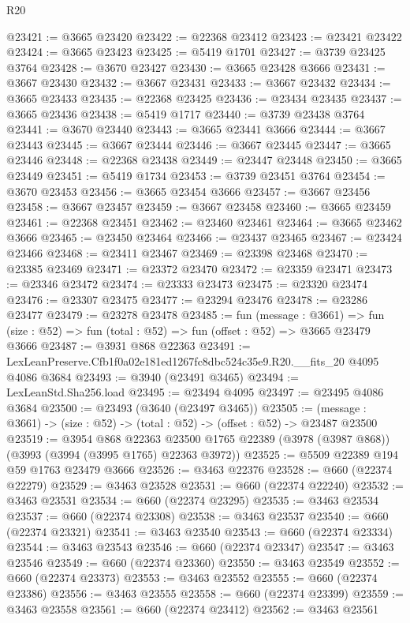 \begin{lexlean}{R20}
\begin{coremodule}
@23421 := @3665 @23420
@23422 := @22368 @23412
@23423 := @23421 @23422
@23424 := @3665 @23423
@23425 := @5419 @1701
@23427 := @3739 @23425 @3764
@23428 := @3670 @23427
@23430 := @3665 @23428 @3666
@23431 := @3667 @23430
@23432 := @3667 @23431
@23433 := @3667 @23432
@23434 := @3665 @23433
@23435 := @22368 @23425
@23436 := @23434 @23435
@23437 := @3665 @23436
@23438 := @5419 @1717
@23440 := @3739 @23438 @3764
@23441 := @3670 @23440
@23443 := @3665 @23441 @3666
@23444 := @3667 @23443
@23445 := @3667 @23444
@23446 := @3667 @23445
@23447 := @3665 @23446
@23448 := @22368 @23438
@23449 := @23447 @23448
@23450 := @3665 @23449
@23451 := @5419 @1734
@23453 := @3739 @23451 @3764
@23454 := @3670 @23453
@23456 := @3665 @23454 @3666
@23457 := @3667 @23456
@23458 := @3667 @23457
@23459 := @3667 @23458
@23460 := @3665 @23459
@23461 := @22368 @23451
@23462 := @23460 @23461
@23464 := @3665 @23462 @3666
@23465 := @23450 @23464
@23466 := @23437 @23465
@23467 := @23424 @23466
@23468 := @23411 @23467
@23469 := @23398 @23468
@23470 := @23385 @23469
@23471 := @23372 @23470
@23472 := @23359 @23471
@23473 := @23346 @23472
@23474 := @23333 @23473
@23475 := @23320 @23474
@23476 := @23307 @23475
@23477 := @23294 @23476
@23478 := @23286 @23477
@23479 := @23278 @23478
@23485 := fun (message : @3661) =>
  fun (size : @52) => fun (total : @52) => fun (offset : @52) => @3665 @23479 @3666
@23487 := @3931 @868 @22363
@23491 := LexLeanPreserve.Cfb1f0a02e181ed1267fc8dbc524c35e9.R20.__fits_20 @4095 @4086 @3684
@23493 := @3940 (@23491 @3465)
@23494 := LexLeanStd.Sha256.load
@23495 := @23494 @4095
@23497 := @23495 @4086 @3684
@23500 := @23493 (@3640 (@23497 @3465))
@23505 := (message : @3661) -> (size : @52) -> (total : @52) -> (offset : @52) -> @23487 @23500
@23519 := @3954
    @868
    @22363
    @23500
    @1765
    @22389
    (@3978 (@3987 @868))
    (@3993 (@3994 (@3995 @1765) @22363 @3972))
@23525 := @5509 @22389 @194 @59 @1763 @23479 @3666
@23526 := @3463 @22376
@23528 := @660 (@22374 @22279)
@23529 := @3463 @23528
@23531 := @660 (@22374 @22240)
@23532 := @3463 @23531
@23534 := @660 (@22374 @23295)
@23535 := @3463 @23534
@23537 := @660 (@22374 @23308)
@23538 := @3463 @23537
@23540 := @660 (@22374 @23321)
@23541 := @3463 @23540
@23543 := @660 (@22374 @23334)
@23544 := @3463 @23543
@23546 := @660 (@22374 @23347)
@23547 := @3463 @23546
@23549 := @660 (@22374 @23360)
@23550 := @3463 @23549
@23552 := @660 (@22374 @23373)
@23553 := @3463 @23552
@23555 := @660 (@22374 @23386)
@23556 := @3463 @23555
@23558 := @660 (@22374 @23399)
@23559 := @3463 @23558
@23561 := @660 (@22374 @23412)
@23562 := @3463 @23561

\end{coremodule}
\end{lexlean}
